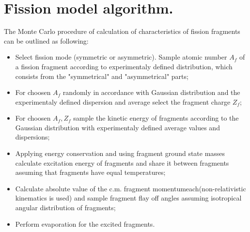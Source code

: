 \section{Fission model algorithm.}

\hspace{1.0em}The Monte Carlo procedure of calculation of characteristics of
fission fragments can be outlined as following:
\begin{itemize}
\item Select fission mode (symmetric or asymmetric). 
Sample atomic number $A_f$ of a fission 
fragment according to experimentaly defined distribution, which consists 
from the "symmetrical" and "asymmetrical" parts; 
\item For choosen $A_f$ randomly in accordance with 
Gaussian distribution and the experimentaly defined 
dispersion and average
 select the fragment charge $Z_f$;
\item For 
choosen $A_f, Z_f$ sample
the kinetic energy of fragments 
 according to the Gaussian 
distribution 
 with experimentaly defined average values 
and dispersions;
\item Applying energy conservation and using fragment ground state masses 
calculate excitation energy of fragments and share it between fragments
assuming that fragments have equal temperatures;
\item Calculate absolute value of the c.m. 
fragment momentumeach(non-relativistic kinematics 
is used) and sample fragment flay off angles assuming isotropical 
angular distribution of fragments;
\item Perform evaporation for the excited fragments.
\end{itemize}
